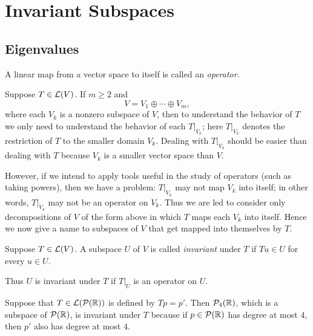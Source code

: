 \section{Invariant Subspaces}

\subsection{Eigenvalues}

\begin{definition}[Operator]\label{ax:5.1}
A linear map from a vector space to itself is called an \emph{operator}.
\end{definition}

%
Suppose $T\in\mathcal{L}(V)$. If $m\ge2$ and
\[ V = V_1\oplus\cdots\oplus V_m, \]
where each $V_k$ is a nonzero subspace of $V$, then to understand the behavior
of $T$ we only need to understand the behavior of each $T|_{V_k}$; here
$T|_{V_k}$ denotes the restriction of $T$ to the smaller domain $V_k$. Dealing
with $T|_{V_k}$ should be easier than dealing with $T$ because $V_k$ is a
smaller vector space than $V$.

However, if we intend to apply tools useful in the study of operators (such as
taking powers), then we have a problem: $T|_{V_k}$ may not map $V_k$ into
itself; in other words, $T|_{V_k}$ may not be an operator on $V_k$. Thus we are
led to consider only decompositions of $V$ of the form above in which $T$ maps
each $V_k$ into itself. Hence we now give a name to subspaces of $V$ that get
mapped into themselves by $T$.

\begin{definition}\label{ax:5.2}
Suppose $T\in\mathcal{L}(V)$. A subspace $U$ of $V$ is called \emph{invariant} under
$T$ if $Tu\in U$ for every $u\in U$.
\end{definition}

Thus $U$ is invariant under $T$ if $T|_U$ is an operator on $U$.

\begin{example}\label{ax:5.3}
Suppose that $T\in\mathcal{L}(\mathcal{P}(\mathbb{R}))$ is defined by $Tp=p'$. Then $\mathcal{P}_4(\mathbb{R})$,
which is a subspace of $\mathcal{P}(\mathbb{R})$, is invariant under $T$ because if
$p\in\mathcal{P}(\mathbb{R})$ has degree at most $4$, then $p'$ also has degree at most $4$.
\end{example}

